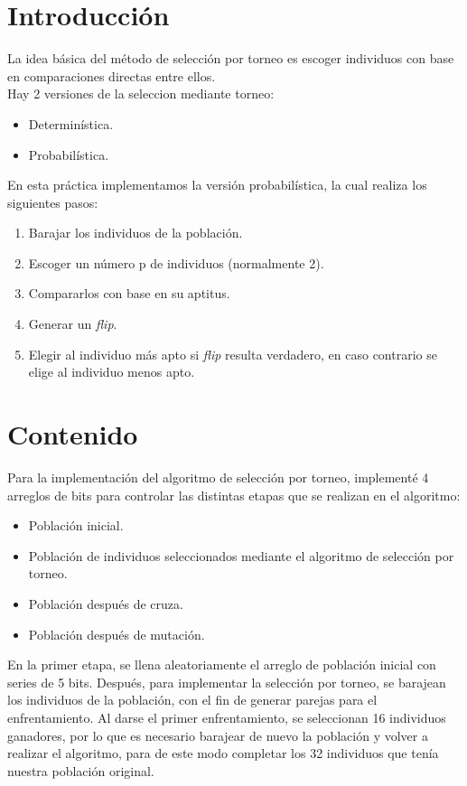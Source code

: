\documentclass[11pt,letterpaper]{article}
\begin{document}


\section*{Introducción}
La idea básica del método de selección por torneo es escoger individuos con base en comparaciones directas entre ellos.\\

Hay 2 versiones de la seleccion mediante torneo:
\begin{itemize}
	\item Determinística.
	\item Probabilística.
\end{itemize}

\noindent
En esta práctica implementamos la versión probabilística, la cual realiza los siguientes pasos:
\begin{enumerate}
	\item Barajar los individuos de la población.
	\item Escoger un número p de individuos (normalmente 2).
	\item Compararlos con base en su aptitus.
	\item Generar un \textit{flip}.
	\item Elegir al individuo más apto si \textit{flip} resulta verdadero, en caso contrario se elige al individuo menos apto.
\end{enumerate}


\section*{Contenido}
Para la implementación del algoritmo de selección por torneo, implementé 4 arreglos de bits para controlar las distintas etapas que se realizan en el algoritmo:
\begin{itemize}
	\item Población inicial.
	\item Población de individuos seleccionados mediante el algoritmo de selección por torneo.
	\item Población después de cruza.
	\item Población después de mutación.
\end{itemize}


En la primer etapa, se llena aleatoriamente el arreglo de población inicial con series de 5 bits. Después, para implementar la selección por torneo, se barajean los individuos de la población, con el fin de generar parejas para el enfrentamiento. Al darse el primer enfrentamiento, se seleccionan 16 individuos ganadores, por lo que es necesario barajear de nuevo la población y volver a realizar el algoritmo, para de este modo completar los 32 individuos que tenía nuestra población original.\\
\end{document}
